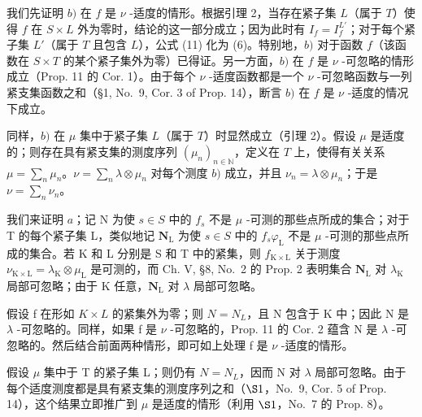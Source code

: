 我们先证明 \(b)\) 在 \(f\) 是 \(\nu\) -适度的情形。根据引理 2，当存在紧子集 \(L\)（属于 \(T\)）使得 \(f\) 在 \(S \times L\) 外为零时，结论的这一部分成立；因为此时有 \(I_f = I_f^{L'}\)；对于每个紧子集 \(L'\)（属于 \(T\) 且包含 \(L\)），公式 (11) 化为 (6)。特别地，\(b)\) 对于函数 \(f\)（该函数在 \(S \times T\) 的某个紧子集外为零）已得证。另一方面，\(b)\) 在 \(f\) 是 \(\nu\) -可忽略的情形成立（Prop. 11 的 Cor. 1）。由于每个 \(\nu\) -适度函数都是一个 \(\nu\) -可忽略函数与一列紧支集函数之和（§1, No.~9, Cor. 3 of Prop. 14），断言 \(b)\) 在 \(f\) 是 \(\nu\) -适度的情况下成立。

同样，\(b)\) 在 \(\mu\) 集中于紧子集 \(L\)（属于 \(T\)）时显然成立（引理 2）。假设 \(\mu\) 是适度的；则存在具有紧支集的测度序列 \((\mu_n)_{n \in \mathbb{N}}\)，定义在 \(T\) 上，使得有关关系 \(\mu = \sum_{n} \mu_n\)。\(\nu = \sum_{n} \lambda \otimes \mu_n\) 对每个测度 \(b)\) 成立，并且 \(\nu_n = \lambda \otimes \mu_n\)；于是 \(\nu = \sum_{n} \nu_n\)。

我们来证明 \(a\)；记 N 为使 \(s \in S\) 中的 \(f_s\) 不是 \(\mu\) -可测的那些点所成的集合；对于 T 的每个紧子集 L，类似地记 \(\mathbf{N}_{\mathrm{L}}\) 为使 \(s \in S\) 中的 \(f_s \varphi_{\mathrm{L}}\) 不是 \(\mu\) -可测的那些点所成的集合。若 K 和 L 分别是 S 和 T 中的紧集，则 \(f_{\mathrm{K} \times \mathrm{L}}\) 关于测度 \(\nu_{\mathrm{K} \times \mathrm{L}} = \lambda_{\mathrm{K}} \otimes \mu_{\mathrm{L}}\) 是可测的，而 Ch. V, §8, No.~2 的 Prop. 2 表明集合 \(\mathbf{N}_{\mathrm{L}}\) 对 \(\lambda_{\mathrm{K}}\) 局部可忽略；由于 K 任意，\(\mathbf{N}_{\mathrm{L}}\) 对 \(\lambda\) 局部可忽略。

假设 f 在形如 \(K \times L\) 的紧集外为零；则 \(N = N_{L}\)，且 N 包含于 K 中；因此 N 是 \(\lambda\) -可忽略的。同样，如果 f 是 \(\nu\) -可忽略的，Prop. 11 的 Cor. 2 蕴含 N 是 \(\lambda\) -可忽略的。然后结合前面两种情形，即可如上处理 f 是 \(\nu\) -适度的情形。

假设 \(\mu\) 集中于 T 的紧子集 L；则仍有 \(N = N_{L}\)，因而 N 对 \(\lambda\) 局部可忽略。由于每个适度测度都是具有紧支集的测度序列之和（\(\S1\)，No.~9, Cor. 5 of Prop. 14），这个结果立即推广到 \(\mu\) 是适度的情形（利用 \(\S1\)，No.~7 的 Prop. 8）。

